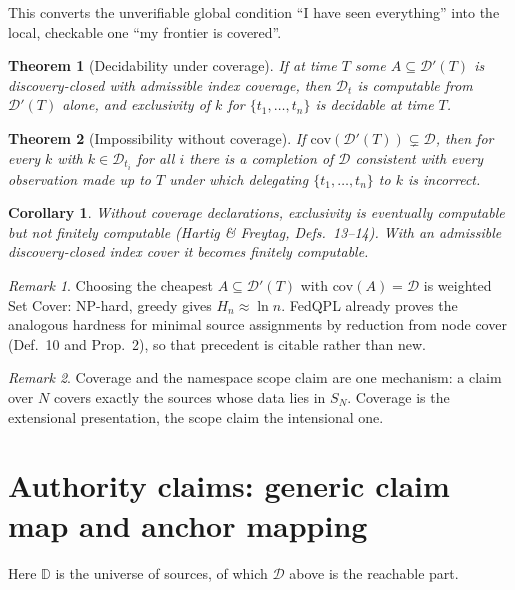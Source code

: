 \documentclass[11pt,a4paper]{article}
\theoremstyle{definition}
\theoremstyle{plain}
\newtheorem{theorem}{Theorem}
\newtheorem{corollary}{Corollary}
\theoremstyle{remark}
\newtheorem*{remark}{Remark}
\newcommand{\Dd}{\mathcal{D}}
\newcommand{\Du}{\mathbb{D}}
\begin{document}
\noindent
This converts the unverifiable global condition ``I have seen everything'' into the
local, checkable one ``my frontier is covered''.

\begin{theorem}[Decidability under coverage]
If at time $T$ some $A \subseteq \Dd'(T)$ is discovery-closed with admissible index
coverage, then $\Dd_t$ is computable from $\Dd'(T)$ alone, and exclusivity of $k$ for
$\{t_1,\dots,t_n\}$ is decidable at time $T$.
\end{theorem}

\begin{theorem}[Impossibility without coverage]
If $\mathrm{cov}(\Dd'(T)) \subsetneq \Dd$, then for every $k$ with $k \in \Dd_{t_i}$ for
all $i$ there is a completion of $\Dd$ consistent with every observation made up to $T$
under which delegating $\{t_1,\dots,t_n\}$ to $k$ is incorrect.
\end{theorem}

\begin{corollary}
Without coverage declarations, exclusivity is \emph{eventually computable} but not
\emph{finitely computable} (Hartig \& Freytag, Defs.~13--14). With an admissible
discovery-closed index cover it becomes finitely computable.
\end{corollary}

\begin{remark}
Choosing the cheapest $A \subseteq \Dd'(T)$ with $\mathrm{cov}(A) = \Dd$ is weighted Set
Cover: NP-hard, greedy gives $H_n \approx \ln n$. FedQPL already proves the analogous
hardness for minimal source assignments by reduction from node cover (Def.~10 and
Prop.~2), so that precedent is citable rather than new.
\end{remark}

\begin{remark}
Coverage and the namespace scope claim are one mechanism: a claim over $N$ covers
exactly the sources whose data lies in $S_N$. Coverage is the extensional presentation,
the scope claim the intensional one.
\end{remark}

\section{Authority claims: generic claim map and anchor mapping}
\label{sec:claims}

Here $\Du$ is the universe of sources, of which $\Dd$ above is the reachable part.
\end{document}
